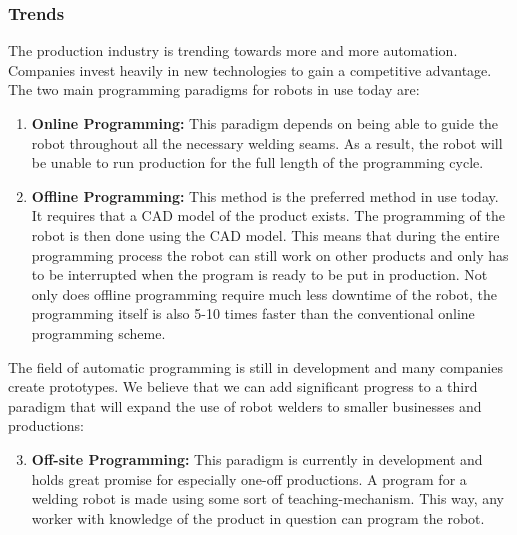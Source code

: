 \subsubsection{Trends}
\label{sec:trends}
The production industry is trending towards more and more automation.
Companies invest heavily in new technologies to gain a competitive advantage. 
The two main programming paradigms for robots in use today are:
\begin{enumerate}
\item \textbf{Online Programming:} This paradigm depends on being able to guide the robot throughout all the necessary welding seams. As a result, the robot will be unable to run production for the full length of the programming cycle.
\item \textbf{Offline Programming:} This method is the preferred method in use today. It requires that a CAD model of the product exists. 
The programming of the robot is then done using the CAD model. 
This means that during the entire programming process the robot can still work on other products and only has to be interrupted when the program is ready to be put in production. 
Not only does offline programming require much less downtime of the robot, the programming itself is also 5-10 times faster than the conventional online programming scheme.	
\end{enumerate}
The field of automatic programming is still in development and many companies create prototypes. We believe that we can add significant progress to a third paradigm that will expand the use of robot welders to smaller businesses and productions:
\begin{enumerate}
\setcounter{enumi}{2}
	\item {\textbf{Off-site Programming:}} This paradigm is currently in development and holds great promise for especially one-off productions. A program for a welding robot is made using some sort of teaching-mechanism. 
	This way, any worker with knowledge of the product in question can program the robot.
\end{enumerate}